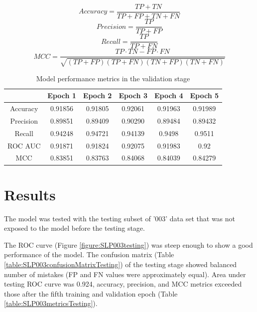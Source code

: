 \documentclass[12pt]{article}
\begin{document}
	\begin{equation}
		Accuracy = \frac{TP+TN}{TP+FP+TN+FN} 
		\label{accuracy}
	\end{equation}
	\begin{equation}
		Precision = \frac{TP}{TP+FP} 
		\label{precision}
	\end{equation}
	\begin{equation}
		Recall = \frac{TP}{TP+FN} 
		\label{recall}
	\end{equation}
	\begin{equation}
		\label{MCC}
		MCC = \frac{TP \cdot TN - FP \cdot FN}{\sqrt{(TP+FP)(TP+FN)(TN+FP)(TN+FN)}} 
	\end{equation}

	\begin{table}[h!]
		\caption{Model performance metrics in the validation stage }
		\vspace{0.2cm}
		\centering
		\begin{tabular}{ | c | c c c c c | }
			\hline 
			& Epoch 1 & Epoch 2 & Epoch 3 & Epoch 4 & Epoch 5 \\
			\hline 
			Accuracy & 0.91856 & 0.91805 & 0.92061 & 0.91963 & 0.91989 \\
			Precision & 0.89851 & 0.89409 & 0.90290 & 0.89484 & 0.89432 \\
			Recall & 0.94248 & 0.94721 & 0.94139 & 0.9498 & 0.9511 \\  
			ROC AUC & 0.91871 & 0.91824 & 0.92075 & 0.91983 & 0.92 \\
			MCC & 0.83851 & 0.83763 & 0.84068 & 0.84039 & 0.84279 \\
			\hline 
		\end{tabular}
		\label{table:SLP003metricsValidation4}
	\end{table}

	\pagebreak

	\section{Results}

	The model was tested with the testing subset of '003' data set that was
	not exposed to the model before the testing stage. 

	The ROC curve (Figure \ref{figure:SLP003testing}) was steep enough to show
	a good performance of the model. The confusion matrix 
	(Table \ref{table:SLP003confusionMatrixTesting}) of the testing stage 
	showed balanced number of mistakes (FP and FN values were approximately 
	equal). Area under testing ROC curve was 0.924, 
	accuracy, precision, and MCC metrics exceeded those after the fifth training 
	and validation epoch (Table \ref{table:SLP003metricsTesting}). 
\end{document}
